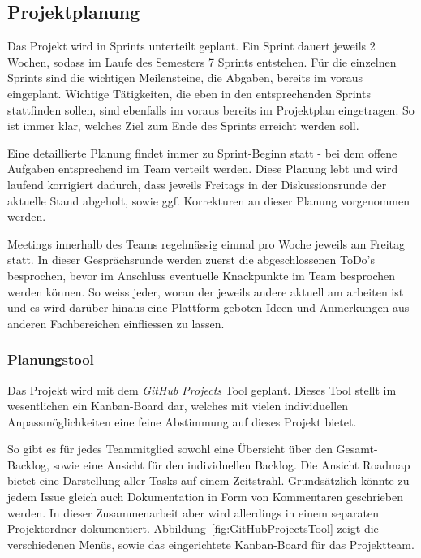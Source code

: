 \documentclass[main.tex]{subfiles} %
\begin{document}

\subsection{Projektplanung}

Das Projekt wird in Sprints unterteilt geplant. Ein Sprint dauert jeweils 2
Wochen, sodass im Laufe des Semesters 7 Sprints entstehen. Für die einzelnen
Sprints sind die wichtigen Meilensteine, die Abgaben, bereits im voraus
eingeplant. Wichtige Tätigkeiten, die eben in den entsprechenden Sprints
stattfinden sollen, sind ebenfalls im voraus bereits im Projektplan
eingetragen. So ist immer klar, welches Ziel zum Ende des Sprints erreicht
werden soll.

Eine detaillierte Planung findet immer zu Sprint-Beginn statt - bei dem offene
Aufgaben entsprechend im Team verteilt werden. Diese Planung lebt und wird
laufend korrigiert dadurch, dass jeweils Freitags in der Diskussionsrunde der
aktuelle Stand abgeholt, sowie ggf. Korrekturen an dieser Planung vorgenommen
werden.

Meetings innerhalb des Teams regelmässig einmal pro Woche jeweils am Freitag
statt. In dieser Gesprächsrunde werden zuerst die abgeschlossenen ToDo's
besprochen, bevor im Anschluss eventuelle Knackpunkte im Team besprochen werden
können. So weiss jeder, woran der jeweils andere aktuell am arbeiten ist und es
wird darüber hinaus eine Plattform geboten Ideen und Anmerkungen aus anderen
Fachbereichen einfliessen zu lassen.

\subsubsection*{Planungstool}
Das Projekt wird mit dem \textit{GitHub Projects} Tool geplant. Dieses Tool stellt im wesentlichen
ein Kanban-Board dar, welches mit vielen individuellen Anpassmöglichkeiten eine feine
Abstimmung auf dieses Projekt bietet.

So gibt es für jedes Teammitglied sowohl eine Übersicht über den
Gesamt-Backlog, sowie eine Ansicht für den individuellen Backlog. Die Ansicht
Roadmap bietet eine Darstellung aller Tasks auf einem Zeitstrahl. Grundsätzlich
könnte zu jedem Issue gleich auch Dokumentation in Form von Kommentaren
geschrieben werden. In dieser Zusammenarbeit aber wird allerdings in einem
separaten Projektordner dokumentiert. Abbildung~\ref{fig:GitHubProjectsTool}
zeigt die verschiedenen Menüs, sowie das eingerichtete Kanban-Board für das
Projektteam.
\end{document}
